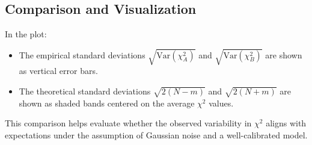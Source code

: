 \documentclass{article}
\begin{document}
\subsection*{Comparison and Visualization}

In the plot:
\begin{itemize}
    \item The empirical standard deviations $\sqrt{\mathrm{Var}(\chi^2_A)}$ and $\sqrt{\mathrm{Var}(\chi^2_B)}$ are shown as vertical error bars.
    \item The theoretical standard deviations $\sqrt{2(N - m)}$ and $\sqrt{2(N + m)}$ are shown as shaded bands centered on the average $\chi^2$ values.
\end{itemize}

This comparison helps evaluate whether the observed variability in $\chi^2$ aligns with expectations under the assumption of Gaussian noise and a well-calibrated model.
\end{document}
